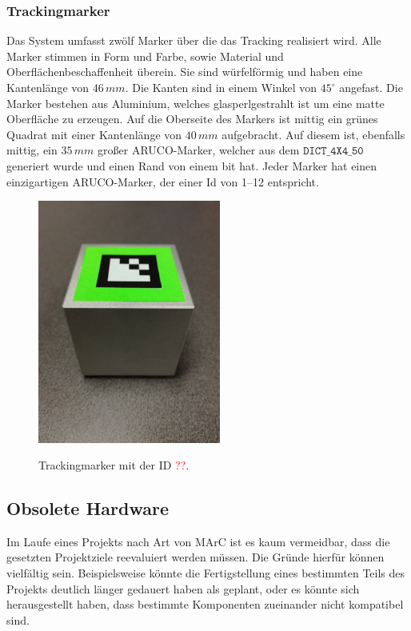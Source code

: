 \subsubsection{Trackingmarker}
Das System umfasst zwölf Marker über die das Tracking realisiert wird. Alle Marker stimmen in Form und Farbe, sowie Material und Oberflächenbeschaffenheit überein. Sie sind würfelförmig und haben eine Kantenlänge von $46\,mm$. Die Kanten sind in einem Winkel von $45^\circ$ angefast. Die Marker bestehen aus Aluminium, welches glasperlgestrahlt ist um eine matte Oberfläche zu erzeugen. Auf die Oberseite des Markers ist mittig ein grünes Quadrat mit einer Kantenlänge von $40\,mm$ aufgebracht. Auf diesem ist, ebenfalls mittig, ein $35\,mm$ großer ARUCO-Marker, welcher aus dem $\texttt{DICT\_4X4\_50}$ generiert wurde und einen Rand von einem bit hat. Jeder Marker hat einen einzigartigen ARUCO-Marker, der einer Id von 1--12 entspricht.


	\begin{figure}[H]
		\center 
		\includegraphics[trim = 0mm 280mm 0mm 150mm, clip, width=6cm]{Bilder/tracking-marker.jpg}
			\label{fig:marker}
			\caption{Trackingmarker mit der ID \textcolor{red}{??}.}
	\end{figure}
	
\subsection{Obsolete Hardware}
Im Laufe eines Projekts nach Art von MArC ist es kaum vermeidbar, dass die gesetzten Projektziele reevaluiert werden müssen. Die Gründe hierfür können vielfältig sein. Beispielsweise könnte die Fertigstellung eines bestimmten Teils des Projekts deutlich länger gedauert haben als geplant, oder es könnte sich herausgestellt haben, dass bestimmte Komponenten zueinander nicht kompatibel sind.

